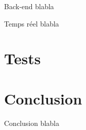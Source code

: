 \documentclass[french]{beamer}
\begin{document}
\begin{frame}{Back-end}
	blabla
\end{frame}


\begin{frame}{Temps réel}
	blabla
\end{frame}

\section{Tests}


\section{Conclusion}
\begin{frame}{Conclusion}
	blabla
\end{frame}
\end{document}
